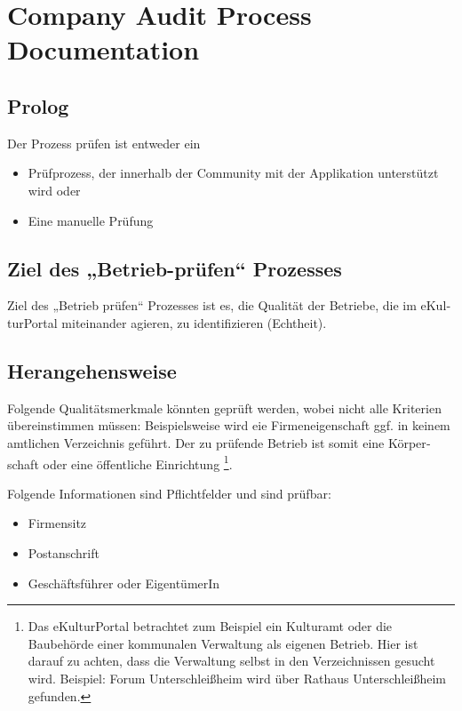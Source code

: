 
\chapter{Company Audit Process Documentation}
\label{app:A}
\begin{otherlanguage}{german}

\section*{Prolog}
Der Prozess prüfen ist entweder ein
\begin{itemize}
\item Prüfprozess, der innerhalb der Community mit der Applikation unterstützt wird oder
\item Eine manuelle Prüfung
\end{itemize}

\section*{Ziel des „Betrieb-prüfen“ Prozesses}
Ziel des „Betrieb prüfen“ Prozesses ist es, die Qualität der Betriebe, die im eKulturPortal miteinander agieren, zu identifizieren (Echtheit). 

\section*{Herangehensweise}
Folgende Qualitätsmerkmale könnten geprüft werden, wobei nicht alle Kriterien übereinstimmen müssen: Beispielsweise wird eie Firmeneigenschaft ggf. in keinem amtlichen Verzeichnis geführt. Der zu prüfende Betrieb ist somit eine Körper\-schaft oder eine öffentliche Einrichtung \footnote{Das eKulturPortal betrachtet zum Beispiel ein Kulturamt oder die Baubehörde einer kommunalen Verwaltung als eigenen Betrieb. Hier ist darauf zu achten, dass die Verwaltung selbst in den Verzeichnissen gesucht wird. Beispiel: Forum Unterschleißheim wird über Rathaus Unterschleißheim gefunden.}.

Folgende Informationen sind Pflichtfelder und sind prüfbar:
	\begin{itemize}
	\item Firmensitz
	\item Postanschrift
	\item Geschäftsführer oder EigentümerIn
	\end{itemize}


\end{otherlanguage}
